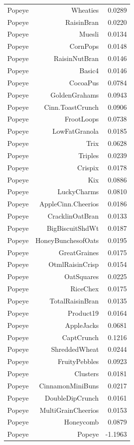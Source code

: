 \begin{longtable}{@{}lrr@{}}
Popeye & Wheaties & 0.0289 \\
Popeye & RaisinBran & 0.0220 \\
Popeye & Muesli & 0.0134 \\
Popeye & CornPops & 0.0148 \\
Popeye & RaisinNutBran & 0.0146 \\
Popeye & Basic4 & 0.0146 \\
Popeye & CocoaPus & 0.0784 \\
Popeye & GoldenGrahams & 0.0943 \\
Popeye & Cinn.ToastCrunch & 0.0906 \\
Popeye & FrootLoops & 0.0738 \\
Popeye & LowFatGranola & 0.0185 \\
Popeye & Trix & 0.0628 \\
Popeye & Triples & 0.0239 \\
Popeye & Crispix & 0.0178 \\
Popeye & Kix & 0.0886 \\
Popeye & LuckyCharms & 0.0810 \\
Popeye & AppleCinn.Cheerios & 0.0186 \\
Popeye & CracklinOatBran & 0.0133 \\
Popeye & BigBiscuitShdWt & 0.0187 \\
Popeye & HoneyBunchesofOats & 0.0195 \\
Popeye & GreatGraines & 0.0175 \\
Popeye & OtmlRaisinCrisp & 0.0154 \\
Popeye & OatSquares & 0.0225 \\
Popeye & RiceChex & 0.0175 \\
Popeye & TotalRaisinBran & 0.0135 \\
Popeye & Product19 & 0.0164 \\
Popeye & AppleJacks & 0.0681 \\
Popeye & CaptCrunch & 0.1216 \\
Popeye & ShreddedWheat & 0.0244 \\
Popeye & FruityPebbles & 0.0923 \\
Popeye & Clusters & 0.0181 \\
Popeye & CinnamonMiniBuns & 0.0217 \\
Popeye & DoubleDipCrunch & 0.0161 \\
Popeye & MultiGrainCheerios & 0.0153 \\
Popeye & Honeycomb & 0.0879 \\
Popeye & Popeye & -1.1963 \\
\bottomrule
\end{longtable}
\endgroup

